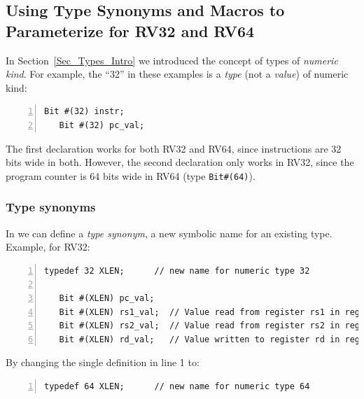 
\subsection{Using Type Synonyms and Macros to Parameterize for RV32 and RV64}

\label{Sec_Type_Synonums_and_Macros}


In Section~\ref{Sec_Types_Intro} we introduced the concept of types of
\emph{numeric kind}. For example, the ``32'' in these examples is a
\emph{type} (not a \emph{value}) of numeric kind:

{\footnotesize
\begin{Verbatim}[frame=single, numbers=left]
   Bit #(32) instr;
   Bit #(32) pc_val;
\end{Verbatim}
}

The first declaration works for both RV32 and RV64, since instructions
are 32 bits wide in both.  However, the second declaration only works
in RV32, since the program counter is 64 bits wide in RV64 (type
\verb|Bit#(64)|).


\subsubsection{Type synonyms}


In {\BSV} we can define a \emph{type synonym}, a new symbolic name for
an existing type. Example, for RV32:

{\footnotesize
\begin{Verbatim}[frame=single, numbers=left]
   typedef 32 XLEN;      // new name for numeric type 32

   Bit #(XLEN) pc_val;
   Bit #(XLEN) rs1_val;  // Value read from register rs1 in register file
   Bit #(XLEN) rs2_val;  // Value read from register rs2 in register file
   Bit #(XLEN) rd_val;   // Value written to register rd in register file
\end{Verbatim}
}

By changing the single definition in line 1 to:

{\footnotesize
\begin{Verbatim}[frame=single, numbers=left]
   typedef 64 XLEN;      // new name for numeric type 64
\end{Verbatim}
}

